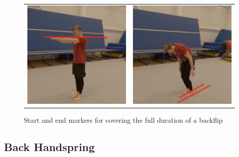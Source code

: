 \begin{figure}
   \centering
\begin{tabular}{cc}
\includegraphics[width=7cm]{images/data-acquisition/example-backflip-marker-start}&
\includegraphics[width=7cm]{images/data-acquisition/example-backflip-marker-end}\\
\end{tabular}
    \caption{Start and end markers for covering the full duration of a backflip}
    \label{example-backflip-markers}
\end{figure}

\subsection{Back Handspring}
\label{back-handspring-description-section}


